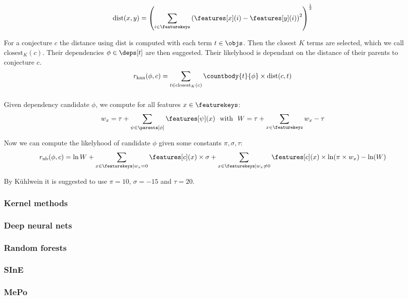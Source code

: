 \subsubsection{\knn}
$$ \text{dist}(x, y) = \left( \sum_{i \in \featurekeys} \left( \features[x](i) - \features[y](i) \right)^2 \right)^{\frac{1}{2}} $$

For a conjecture $c$ the distance using $\text{dist}$ is computed with each term $t \in \objs$.
Then the closest $K$ terms are selected, which we call $\text{closest}_K(c)$.
Their dependencies $\phi \in \deps[t]$ are then suggested.
Their likelyhood is dependant on the distance of their parents to conjecture $c$.
\[ r_\text{knn}(\phi, c) = \sum_{t \in \text{closest}_K(c)} \countbody{t}{\phi} \times \text{dist}(c, t) \]

\subsubsection{\nb}

Given dependency candidate $\phi$, we compute for all features $x \in \featurekeys$:
\[
	w_x = \tau + \sum_{\psi \in \parents[\phi]} \features[\psi](x) ~~\text{with}~~ W = \tau + \sum_{x \in \featurekeys} w_x - \tau
\]

Now we can compute the likelyhood of candidate $\phi$ given some constants $\pi, \sigma, \tau$:
\[
	r_\text{nb}(\phi, c) = \ln W +
	\sum_{x \in \featurekeys | w_x = 0} \features[c](x) \times \sigma +
	\sum_{x \in \featurekeys | w_x \neq 0} \features[c](x) \times \ln(\pi \times w_x) - \ln(W)
\]

By K\"uhlwein \cite{kuhlwein2013mash} it is suggested to use $\pi = 10$, $\sigma = -15$ and $\tau = 20$.

\subsubsection{Kernel methods}
\subsubsection{Deep neural nets}
\subsubsection{Random forests}
\subsubsection{SInE}
\subsubsection{MePo}
